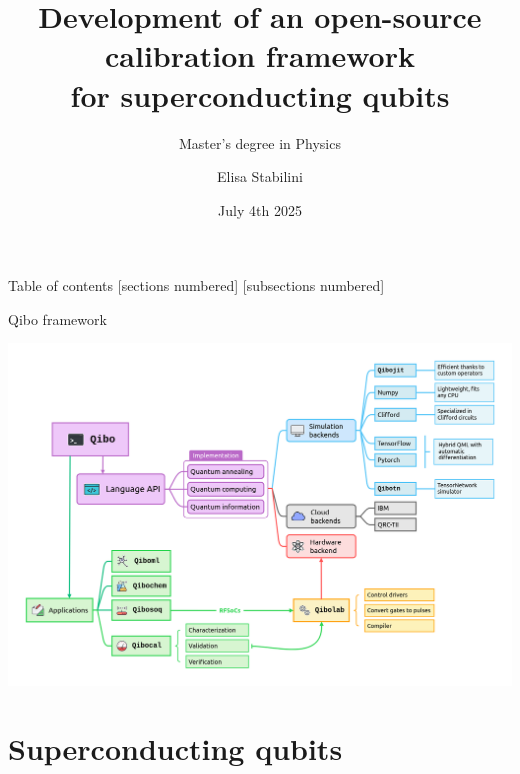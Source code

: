 \documentclass[aspectratio=169,10pt]{beamer}
\title{Development of an open-source calibration framework\\ for superconducting qubits}
\subtitle{Master's degree in Physics}
\author{Elisa Stabilini}
\institute{Università degli Studi di Milano - Department of Physics}
\date{July 4th 2025}
\begin{document}
\maketitle

\begin{frame}{Table of contents}
    [sections numbered]
    [subsections numbered]  
    \tableofcontents[hideallsubsections]
\end{frame}

\begin{frame}[t,fragile]{Qibo framework}
  \begin{center}
      \includegraphics[height=0.80\paperheight]{figures/qibo_ecosystem.png}
  \end{center}
\end{frame}

\section{Superconducting qubits}
\end{document}
